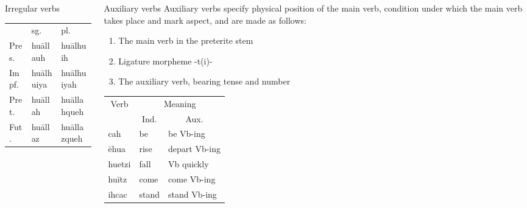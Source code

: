 \documentclass[12pt]{beamer}
\newcommand{\nah}[1]{\textcolor{nahgrn}{#1}}
\newcommand{\trs}[1]{\textcolor{nahblu}{#1}}
\begin{document}
\begin{frame}
\begin{columns}[t]
\begin{column}{.18\linewidth}
\begin{block}{Irregular verbs}
\begin{enumerate}
\begin{tabular}[t]{lll}
                        & sg.             & pl.                        \\
                  Pres. & \nah{huāllauh}  & \nah{huālhuih}             \\
                  Impf. & \nah{huālhuiya} & \nah{huālhuiyah}           \\
                  Pret. & \nah{huāllah}   & \nah{huāllahqueh}          \\
                  Fut.  & \nah{huāllaz}   & \nah{huāllazqueh}          \\
                \end{tabular}%
        \end{enumerate}
      \end{block}
    \end{column}
    \begin{column}{.18\linewidth}
      \begin{block}{Auxiliary verbs}
        Auxiliary verbs specify physical position of the main verb, condition under which the main verb takes place and mark aspect, and are made as follows:
        \begin{enumerate}
          \item The main verb in the preterite stem
          \item Ligature morpheme \nah{-t(i)-}
          \item The auxiliary verb, bearing tense and number
        \end{enumerate}
        \begin{threeparttable}
          \begin{tabular}{lll}
            \multicolumn{1}{c}{Verb} & \multicolumn{2}{c}{Meaning}                            \\
                                     & \multicolumn{1}{c}{Ind.}    & \multicolumn{1}{c}{Aux.} \\
            \nah{cah}                & \trs{be}                    & \trs{be Vb-ing}          \\
            \nah{ēhua}               & \trs{rise}                  & \trs{depart   Vb-ing}    \\
            \nah{huetzi}             & \trs{fall}                  & \trs{Vb   quickly}       \\
            \nah{huītz}              & \trs{come}                  & \trs{come   Vb-ing}      \\
            \nah{ihcac}              & \trs{stand}                 & \trs{stand   Vb-ing}     \\

\end{tabular}
\end{threeparttable}
\end{block}
\end{column}
\end{columns}
\end{frame}
\end{document}
